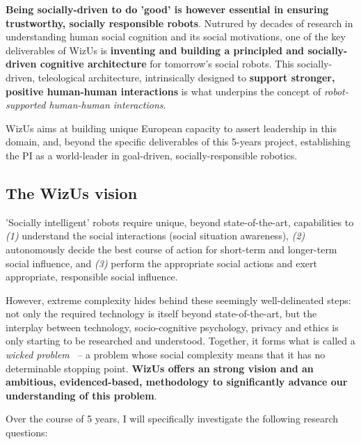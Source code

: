 \documentclass[11pt]{report}
\newcommand{\project}{WizUs\xspace}
\begin{document}
\textbf{Being socially-driven to do 'good' is however essential in ensuring
trustworthy, socially responsible robots}. Nutrured by decades of research in
understanding human social cognition and its social motivations, one of the key
deliverables of \project is \textbf{inventing and building a
principled and socially-driven cognitive architecture} for tomorrow's social
robots. This socially-driven, teleological architecture, intrinsically designed to
\textbf{support stronger, positive human-human interactions} is what underpins
the concept of \emph{robot-supported human-human interactions}.

\project aims at building unique European capacity to assert leadership in this
domain, and, beyond the specific deliverables of this 5-years project,
establishing the PI as a world-leader in goal-driven, socially-responsible
robotics.

\subsection{The \project vision}


'Socially intelligent' robots require unique, beyond state-of-the-art,
capabilities to \emph{(1)} understand the social interactions (social
situation awareness), \emph{(2)} autonomously decide the best course of action for
short-term and longer-term social influence, and \emph{(3)} perform the
appropriate social actions and exert appropriate, responsible social influence.

However, extreme complexity hides behind these seemingly well-delineated steps:
not only the required technology is itself beyond state-of-the-art, but the
interplay between technology, socio-cognitive psychology, privacy and ethics is
only starting to be researched and understood. Together, it forms what is called
a \emph{wicked problem}~\cite{tonkinwise2015design} -- a problem whose social complexity
means that it has no determinable stopping point. \textbf{\project offers an
strong vision and an ambitious, evidenced-based, methodology to significantly
advance our understanding of this problem}.

Over the course of 5 years, I will specifically investigate the following
research questions:
\end{document}
